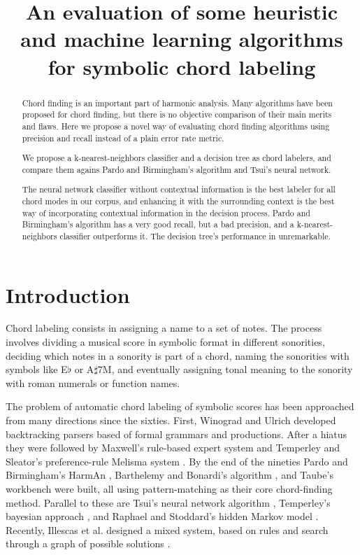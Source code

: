 \documentclass{article}
\title{An evaluation of some heuristic and machine learning algorithms for
  symbolic chord labeling}
\begin{document}
\graphicspath{{figs/}{data/}}
\maketitle

\begin{abstract}

  Chord finding is an important part of harmonic analysis. Many
  algorithms have been proposed for chord finding, but there is no
  objective comparison of their main merits and flaws. Here we propose
  a novel way of evaluating chord finding algorithms using precision
  and recall instead of a plain error rate metric.
  
  We propose a k-nearest-neighbors classifier and a decision tree as
  chord labelers, and compare them agains Pardo and Birmingham's
  algorithm and Tsui's neural network.
  
  The neural network classifier without contextual information is the
  best labeler for all chord modes in our corpus, and enhancing it
  with the surrounding context is the best way of incorporating
  contextual information in the decision process. Pardo and
  Birmingham's algorithm has a very good recall, but a bad precision,
  and a k-nearest-neighbors classifier outperforms it. The decision
  tree's performance in unremarkable.
\end{abstract}

\section{Introduction}
\label{sec:introduction}

Chord labeling consists in assigning a name to a set of notes. The
process involves dividing a musical score in symbolic format in
different sonorities, deciding which notes in a sonority is part of a
chord, naming the sonorities with symbols like E$\flat$ or
A$\sharp$7M, and eventually assigning tonal meaning to the sonority
with roman numerals or function names.

The problem of automatic chord labeling of symbolic scores has been
approached from many directions since the sixties. First, Winograd
\cite{winograd68:linguistics} and Ulrich \cite{ulrich77:analysis}
developed backtracking parsers based of formal grammars and
productions. After a hiatus they were followed by Maxwell's
\cite{maxwell92:expert} rule-based expert system and Temperley and
Sleator's preference-rule Melisma system
\cite{temperley.ea99:modeling}. By the end of the nineties Pardo and
Birmingham's HarmAn \cite{barthelemy.ea01:figured}, Barthelemy and
Bonardi's algorithm \cite{pardo.ea02:algorithms}, and Taube's
workbench \cite{taube99:automatic} were built, all using
pattern-matching as their core chord-finding method. Parallel to these
are Tsui's neural network algorithm \cite{tsui02:harmonic}, Temperley's
bayesian approach \cite{temperley04:bayesian}, and Raphael and
Stoddard's hidden Markov model \cite{raphael.ea03:harmonic}. Recently,
Illescas et al. designed a mixed system, based on rules and search
through a graph of possible solutions \cite{illescas.ea07:harmonic}.
\end{document}
